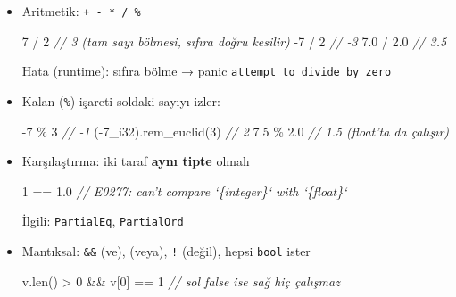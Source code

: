 \documentclass[12pt,a4paper]{article}
\newenvironment{Shaded}{}{}
\newcommand{\CommentTok}[1]{\textcolor[rgb]{0.38,0.63,0.69}{\textit{#1}}}
\newcommand{\DecValTok}[1]{\textcolor[rgb]{0.25,0.63,0.44}{#1}}
\newcommand{\FloatTok}[1]{\textcolor[rgb]{0.25,0.63,0.44}{#1}}
\newcommand{\FunctionTok}[1]{\textcolor[rgb]{0.02,0.16,0.49}{#1}}
\newcommand{\NormalTok}[1]{#1}
\newcommand{\OperatorTok}[1]{\textcolor[rgb]{0.40,0.40,0.40}{#1}}
\begin{document}
\begin{itemize}
\item
  Aritmetik: \texttt{+\ -\ *\ /\ \%}

\begin{Shaded}
\begin{Highlighting}[]
\DecValTok{7} \OperatorTok{/} \DecValTok{2}      \CommentTok{// 3   (tam sayı bölmesi, sıfıra doğru kesilir)}
\OperatorTok{-}\DecValTok{7} \OperatorTok{/} \DecValTok{2}     \CommentTok{// -3}
\FloatTok{7.0} \OperatorTok{/} \FloatTok{2.0}  \CommentTok{// 3.5}
\end{Highlighting}
\end{Shaded}


  Hata (runtime): sıfıra bölme → panic \texttt{attempt\ to\ divide\ by\ zero}
\item
  Kalan (\texttt{\%}) işareti soldaki sayıyı izler:

\begin{Shaded}
\begin{Highlighting}[]
\OperatorTok{-}\DecValTok{7} \OperatorTok{\%} \DecValTok{3}               \CommentTok{// -1}
\OperatorTok{(-}\DecValTok{7\_i}\DecValTok{32}\OperatorTok{).}\FunctionTok{rem\_euclid}\OperatorTok{(}\DecValTok{3}\OperatorTok{)} \CommentTok{// 2}
\FloatTok{7.5} \OperatorTok{\%} \FloatTok{2.0}            \CommentTok{// 1.5 (float'ta da çalışır)}
\end{Highlighting}
\end{Shaded}
\item
  Karşılaştırma: iki taraf \textbf{aynı tipte} olmalı

\begin{Shaded}
\begin{Highlighting}[]
\DecValTok{1} \OperatorTok{==} \FloatTok{1.0}     \CommentTok{// E0277: can't compare `\{integer\}` with `\{float\}`}
\end{Highlighting}
\end{Shaded}


  İlgili: \texttt{PartialEq}, \texttt{PartialOrd}
\item
  Mantıksal: \texttt{\&\&} (ve), \texttt{\textbar{}\textbar{}} (veya), \texttt{!} (değil), hepsi \texttt{bool} ister

\begin{Shaded}
\begin{Highlighting}[]
\NormalTok{v}\OperatorTok{.}\FunctionTok{len}\OperatorTok{()} \OperatorTok{\textgreater{}} \DecValTok{0} \OperatorTok{\&\&}\NormalTok{ v}\OperatorTok{[}\DecValTok{0}\OperatorTok{]} \OperatorTok{==} \DecValTok{1}   \CommentTok{// sol false ise sağ hiç çalışmaz}
\end{Highlighting}
\end{Shaded}



\end{itemize}
\end{document}
